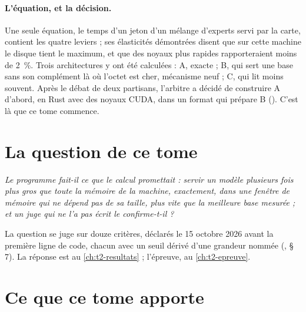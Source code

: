\paragraph{L'équation, et la décision.} Une seule équation, le temps d'un jeton d'un mélange d'experts servi par la carte, contient les quatre leviers ; ses élasticités démontrées disent que sur cette machine le disque tient le maximum, et que des noyaux plus rapides rapporteraient moins de \SI{2}{\percent}. Trois architectures y ont été calculées : A, exacte ; B, qui sert une base sans son complément là où l'octet est cher, mécanisme neuf ; C, qui lit moins souvent. Après le débat de deux partisans, l'arbitre a décidé de construire A d'abord, en Rust avec des noyaux CUDA, dans un format qui prépare B (). C'est là que ce tome commence.

\section{La question de ce tome}\label{t2i-sec:question}

\begin{center}
\begin{tcolorbox}[enhanced, width=0.92\linewidth, colback=Fond, colframe=Accent, boxrule=0.6pt, arc=1pt]
\emph{Le programme fait-il ce que le calcul promettait : servir un modèle plusieurs fois plus gros que toute la mémoire de la machine, exactement, dans une fenêtre de mémoire qui ne dépend pas de sa taille, plus vite que la meilleure base mesurée ; et un juge qui ne l'a pas écrit le confirme-t-il ?}
\end{tcolorbox}
\end{center}

La question se juge sur douze critères, déclarés le 15 octobre 2026 avant la première ligne de code, chacun avec un seuil dérivé d'une grandeur nommée (, § 7). La réponse est au \cref{ch:t2-resultats} ; l'épreuve, au \cref{ch:t2-epreuve}.

\section{Ce que ce tome apporte}\label{t2i-sec:apports}

